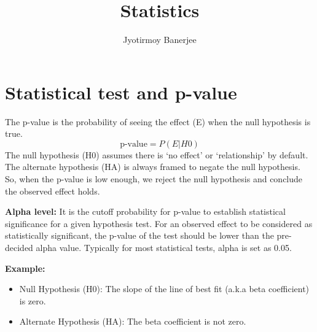 \documentclass{article}
\title{Statistics}
\author{Jyotirmoy Banerjee}
\begin{document}
\maketitle

\section{Statistical test and p-value}
The p-value is the probability of seeing the effect (E) when the null hypothesis is true.
\[
\text{p-value} = P(E|H0)
\]
The null hypothesis (H0) assumes there is `no effect' or `relationship' by default. The alternate hypothesis (HA) is always framed to negate the null hypothesis. So, when the p-value is low enough, we reject the null hypothesis and conclude the observed effect holds.

\textbf{Alpha level:}
It is the cutoff probability for p-value to establish statistical significance for a given hypothesis test.
For an observed effect to be considered as statistically significant, the p-value of the test should be lower than the pre-decided alpha value.
Typically for most statistical tests, alpha is set as 0.05.

\textbf{Example:}
\begin{itemize}
\itemsep0em
\item Null Hypothesis (H0): The slope of the line of best fit (a.k.a beta coefficient) is zero.
\item Alternate Hypothesis (HA): The beta coefficient is not zero.
\end{itemize}
\end{document}
